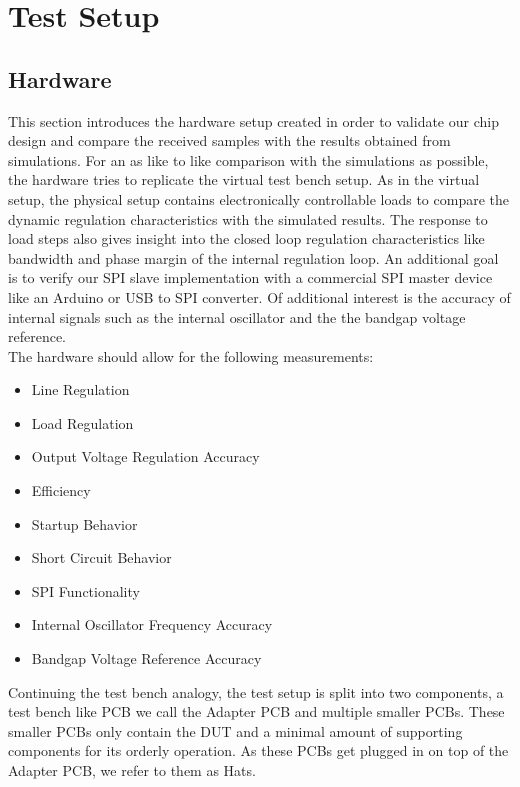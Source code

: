 \section{Test Setup}
\label{sec:testsetup}
\subsection{Hardware}
\label{sec:hardware}
This section introduces the hardware setup created in order to validate our chip design and compare the received samples with the results obtained from simulations. For an as like to like comparison with the simulations as possible, the hardware tries to replicate the virtual test bench setup. As in the virtual setup, the physical setup contains electronically controllable loads to compare the dynamic regulation characteristics with the simulated results. The response to load steps also gives insight into the closed loop regulation characteristics like bandwidth and phase margin of the internal regulation loop. An additional goal is to verify our SPI slave implementation with a commercial SPI master device like an Arduino or USB to SPI converter. Of additional interest is the accuracy of internal signals such as the internal oscillator and the the bandgap voltage reference.\\
The hardware should allow for the following measurements:
\begin{itemize}
    \item Line Regulation
    \item Load Regulation
    \item Output Voltage Regulation Accuracy 
    \item Efficiency
    \item Startup Behavior
    \item Short Circuit Behavior
    \item SPI Functionality
    \item Internal Oscillator Frequency Accuracy
    \item Bandgap Voltage Reference Accuracy
\end{itemize}

Continuing the test bench analogy, the test setup is split into two components, a test bench like \ac{PCB} we call the Adapter \ac{PCB} and multiple smaller \ac{PCB}s. These smaller \ac{PCB}s only contain the \ac{DUT} and a minimal amount of supporting components for its orderly operation. As these \ac{PCB}s get plugged in on top of the Adapter \ac{PCB}, we refer to them as Hats.


